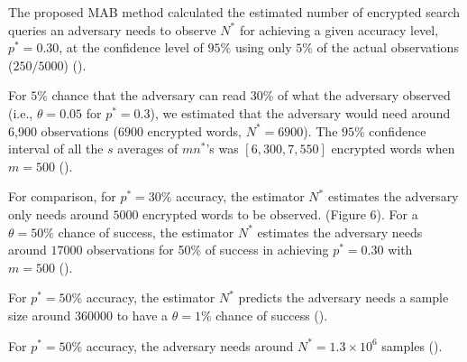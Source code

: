\documentclass[ ../main.tex]{subfiles}
\begin{document}
The proposed MAB method calculated the estimated number of encrypted search queries an adversary needs to observe $N^*$ for achieving a given accuracy level, $p^* = 0.30$, at the confidence level of $95\%$ using only $5\%$ of the actual observations ($250/5000$) ().

For $5\%$ chance that the adversary can read 30\% of what the adversary observed (i.e., $\theta = 0.05$ for $p^* = 0.3$), we estimated that the adversary would need around 6,900 observations ($6900$ encrypted words, $N^* = 6900$). The $95\%$ confidence interval of all the $s$ averages of $m n^*$'s was $[6,300, 7,550]$ encrypted words when $m = 500$ ().

For comparison, for $p^* = 30\%$ accuracy, the estimator $N^*$ estimates the adversary only needs around $5000$ encrypted words to be observed. (Figure 6). For a $\theta = 50\%$ chance of success, the estimator $N^*$ estimates the adversary needs around $17000$ observations for 50\% of success in achieving $p^* = 0.30$ with $m = 500$ ().

For $p^* = 50\%$ accuracy, the estimator $N^*$ predicts the adversary needs a sample size around $360000$ to have a $\theta = 1\%$ chance of success ().

For $p^* = 50\%$ accuracy, the adversary needs around $N^* = 1.3 \times 10^6$ samples ().
\end{document}
